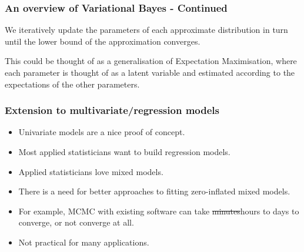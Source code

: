 \documentclass{beamer}
\begin{document}
\begin{frame}
	\frametitle{An overview of Variational Bayes - Continued}
	We iteratively update the parameters of each approximate distribution
	in turn until the lower bound of the approximation converges.
	
	\bigskip 
	This could be thought of as a generalisation of Expectation Maximisation, where each parameter is thought of as a latent
	variable and estimated according to the expectations of the other parameters.
\end{frame}

\begin{frame}
	\frametitle{Extension to multivariate/regression models}
	\begin{itemize}
		\item Univariate models are a nice proof of concept.
		\item Most applied statisticians want to build regression models.
		\item Applied statisticians love mixed models.
		\item There is a need for better approaches to fitting zero-inflated mixed models.
		\item For example, MCMC with existing software can take \sout{minutes}hours 
		      to days to converge, or not converge at all.
		\item Not practical for many applications.
	\end{itemize}
\end{frame}
\end{document}
